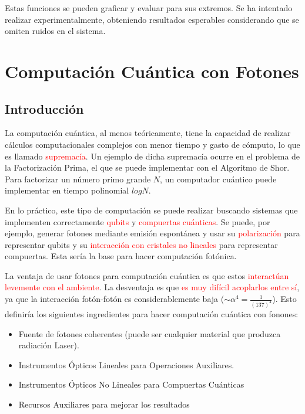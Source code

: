 \documentclass{book}
\begin{document}
Estas funciones se pueden graficar y evaluar para sus extremos. Se ha intentado realizar experimentalmente, obteniendo resultados esperables considerando que se omiten ruidos en el sistema.



\chapter{Computación Cuántica con Fotones}
\section{Introducción}
La computación cuántica, al menos teóricamente, tiene la capacidad de realizar cálculos computacionales complejos con menor tiempo y gasto de cómputo, lo que es llamado \textcolor{red}{supremacía}. Un ejemplo de dicha supremacía ocurre en el problema de la Factorización Prima, el que se puede implementar con el Algoritmo de Shor. Para factorizar un número primo grande $N$, un computador cuántico puede implementar en tiempo polinomial $log N$. 

En lo práctico, este tipo de computación se puede realizar buscando sistemas que implementen correctamente \textcolor{red}{qubits} y \textcolor{red}{compuertas cuánticas}. Se puede, por ejemplo, generar fotones mediante emisión espontánea y usar su \textcolor{red}{polarización} para representar qubits y su \textcolor{red}{interacción con cristales no lineales} para representar compuertas. Esta sería la base para hacer computación fotónica.

La ventaja de usar fotones para computación cuántica es que estos \textcolor{red}{interactúan levemente con el ambiente}. La desventaja es que \textcolor{red}{es muy difícil acoplarlos entre sí}, ya que la interacción fotón-fotón es considerablemente baja ($\sim \alpha^4 =\frac{1}{(137)^4}$). Esto definiría los siguientes ingredientes para hacer computación cuántica con fonones:

\begin{itemize}
    \item Fuente de fotones coherentes (puede ser cualquier material que produzca radiación Laser).
    \item Instrumentos Ópticos Lineales para Operaciones Auxiliares.
    \item Instrumentos Ópticos No Lineales para Compuertas Cuánticas
    \item Recursos Auxiliares para mejorar los resultados
\end{itemize}
\end{document}
